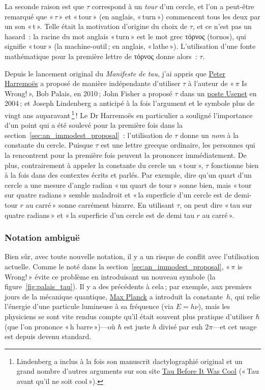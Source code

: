 La seconde raison est que $\tau$ correspond à un \emph{tour} d'un cercle, et l'on a peut-être remarqué que «\,$\tau$\,» et «\,tour\,» (en anglais, «\,turn\,») commencent tous les deux par un son «\,t\,». Telle était la motivation d'origine du choix de $\tau$, et ce n'est pas un hasard~: la racine du mot anglais «\,turn\,» est le mot grec τόρνος (tornos), qui signifie «\,tour\,» (la machine-outil\,; en anglais, «\,lathe\,»). L'utilisation d'une fonte mathématique pour la première lettre de τόρνος donne alors~: $\tau$.

Depuis le lancement original du \emph{Manifeste de tau}, j'ai appris que \href{http://www.harremoes.dk/Peter/Undervis/Turnpage/Turnpage1.pdf}{Peter Harremoës} a proposé de manière indépendante d'utiliser $\tau$ à l'auteur de «\,$\pi$ Is Wrong!\,», Bob Palais, en 2010\,; John Fisher a proposé $\tau$ dans un \href{https://groups.google.com/forum/#!msg/sci.math/c-DHmJHSA0A/sLCoOtHB1UAJ}{poste Usenet} en 2004\,; et Joseph Lindenberg a anticipé à la fois l'argument et le symbole plus de vingt ans auparavant\,\footnote{Lindenberg a inclus à la fois son manuscrit dactylographié original et un grand nombre d'autres arguments sur son site \href{https://sites.google.com/site/taubeforeitwascool/}{Tau Before It Was Cool} («\,Tau avant qu'il ne soit cool\,»).}\,! Le Dr Harremoës en particulier a souligné l'importance d'un point qui a été soulevé pour la première fois dans la section~\ref{sec:an_immodest_proposal}~: l'utilisation de $\tau$ donne un \emph{nom} à la constante du cercle. Puisque $\tau$ est une lettre grecque ordinaire, les personnes qui la rencontrent pour la première fois peuvent la prononcer immédiatement. De plus, contrairement à appeler la constante du cercle un «\,tour\,»,
$\tau$ fonctionne bien à la fois dans des contextes écrits et parlés. Par exemple, dire qu'un quart d'un cercle a une mesure d'angle radian «\,un quart de tour\,» sonne bien, mais «\,tour sur quatre radians\,» semble maladroit et «\,la superficie d'un cercle est de demi-tour $r$ au carré\,» sonne carrément bizarre. En utilisant $\tau$, on peut dire «\,tau sur quatre radians\,» et «\,la superficie d'un cercle est de demi tau $r$ au carré\,».

    \subsubsection{Notation ambiguë} %
    \label{sec:ambiguous_notation}


Bien sûr, avec toute nouvelle notation, il y a un risque de conflit avec l'utilisation actuelle. Comme le noté dans la section~\ref{sec:an_immodest_proposal}, «\,$\pi$ is Wrong!\,» évite ce problème en introduisant un nouveau symbole (la figure~\ref{fig:palais_tau}). Il y a des précédents à cela\,; par exemple, aux premiers jours de la mécanique quantique, \href{https://fr.wikipedia.org/wiki/Max_Planck}{Max Planck} a introduit la constante~$h$, qui relie l'énergie d'une particule lumineuse à sa fréquence (via $E = h\nu$), mais les physiciens se sont vite rendus compte qu'il était souvent plus pratique d'utiliser $\hbar$ (que l'on prononce «\,h barre\,»)---où $\hbar$ est juste $h$ divisé par\textellipsis{} euh\textellipsis{} $2\pi$---et cet usage est depuis devenu standard.

